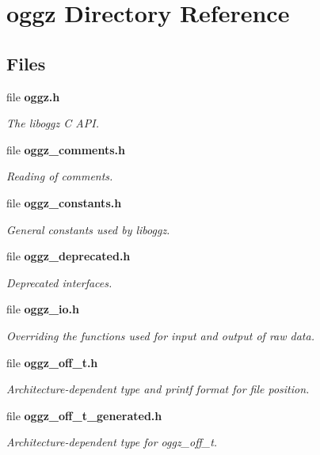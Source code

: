 \section{oggz Directory Reference}
\label{dir_d87111fb9e25a5f2a11bf853c53bb708}
\subsection*{Files}
\begin{DoxyCompactItemize}
\item 
file {\bf oggz.\-h}
\begin{DoxyCompactList}\small\item\em The liboggz C A\-P\-I. \end{DoxyCompactList}\item 
file {\bf oggz\-\_\-comments.\-h}
\begin{DoxyCompactList}\small\item\em Reading of comments. \end{DoxyCompactList}\item 
file {\bf oggz\-\_\-constants.\-h}
\begin{DoxyCompactList}\small\item\em General constants used by liboggz. \end{DoxyCompactList}\item 
file {\bf oggz\-\_\-deprecated.\-h}
\begin{DoxyCompactList}\small\item\em Deprecated interfaces. \end{DoxyCompactList}\item 
file {\bf oggz\-\_\-io.\-h}
\begin{DoxyCompactList}\small\item\em Overriding the functions used for input and output of raw data. \end{DoxyCompactList}\item 
file {\bf oggz\-\_\-off\-\_\-t.\-h}
\begin{DoxyCompactList}\small\item\em Architecture-\/dependent type and printf format for file position. \end{DoxyCompactList}\item 
file {\bf oggz\-\_\-off\-\_\-t\-\_\-generated.\-h}
\begin{DoxyCompactList}\small\item\em Architecture-\/dependent type for oggz\-\_\-off\-\_\-t. \end{DoxyCompactList}\item 

\end{DoxyCompactItemize}
